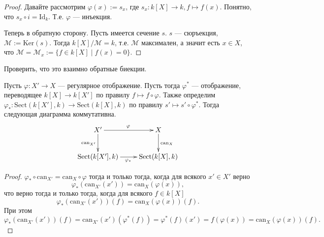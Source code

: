 \documentclass[12pt,a4paper]{article}
\newcommand{\Id}{\mathrm{Id}}
\newcommand{\Ker}{\mathrm{Ker}}
\newcommand{\Sect}{\mathrm{Sect}}
\newcommand{\can}{\mathrm{can}}
\begin{document}
    \begin{proof}
        Давайте рассмотрим $\varphi(x) := s_x$, где $s_x: k[X] \to k, f \mapsto f(x)$. Понятно, что $s_x \circ i = \Id_k$. Т.е. $\varphi$ --- инъекция.

        Теперь в обратную сторону. Пусть имеется сечение $s$. $s$ --- сюръекция, $\mathcal{M} := \Ker(s)$. Тогда $k[X]/\mathcal{M} = k$, т.е. $\mathcal{M}$ максимален, а значит есть $x \in X$, что $\mathcal{M} = \mathcal{M}_x := \{f \in k[X] \mid f(x) = 0\}$.
    \end{proof}

    \begin{exercise}
        Проверить, что это взаимно обратные биекции.
    \end{exercise}

    \begin{lemma}
        Пусть $\varphi: X' \to X$ --- регулярное отображение. Пусть тогда $\varphi^*$ --- отображение, переводящее $k[X] \to k[X']$ по правилу $f \mapsto f \circ \varphi$. Также определим $\varphi_*: \Sect(k[X'], k) \to \Sect(k[X], k)$ по правилу $s' \mapsto s' \circ \varphi^*$. Тогда следующая диаграмма коммутативна.
        \[
            \xymatrix{
                X' \ar[r]^\varphi \ar[d]_{\can_{X'}}& X \ar[d]^{\can_{X}}\\
                \Sect(k[X'], k) \ar[r]_{\varphi_*}& \Sect(k[X], k)
            }
        \]
    \end{lemma}

    \begin{proof}
        $\varphi_* \circ \can_{X'} = \can_X \circ \varphi$ тогда и только тогда, когда для всякого $x' \in X'$ верно
        \[\varphi_*(\can_{X'}(x')) = \can_X(\varphi(x)),\]
        что верно тогда и только тогда, когда для всякого $f \in k[X]$
        \[\varphi_*(\can_{X'}(x'))(f) = \can_X(\varphi(x))(f).\]
        При этом
        \[
            \varphi_*(\can_{X'}(x'))(f)
            = \can_{X'}(x')(\varphi^*(f))
            = \varphi^*(f)(x')
            = f(\varphi(x))
            = \can_X(\varphi(x))(f).
        \]
    \end{proof}
\end{document}
